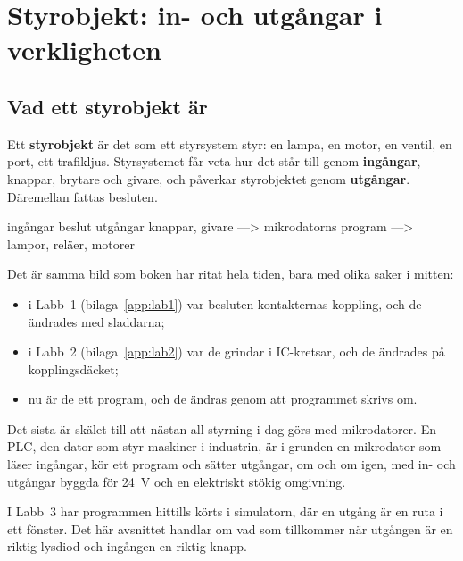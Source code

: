 %

\section{Styrobjekt: in- och utgångar i verkligheten}
\label{c11:app:a}

\subsection{Vad ett styrobjekt är}
\label{c11:a1}
Ett \textbf{styrobjekt} är det som ett styrsystem styr: en lampa, en motor, en ventil, en port, ett
trafikljus. Styrsystemet får veta hur det står till genom \textbf{ingångar}, knappar, brytare och
givare, och påverkar styrobjektet genom \textbf{utgångar}. Däremellan fattas besluten.

\begin{textdrawing}
   ingångar                    beslut                     utgångar
 knappar, givare   --->   mikrodatorns program   --->   lampor, reläer, motorer
\end{textdrawing}

\noindent Det är samma bild som boken har ritat hela tiden, bara med olika saker i mitten:
\begin{itemize}
  \item i Labb~1 (bilaga~\ref{app:lab1}) var besluten kontakternas koppling, och de ändrades med
    sladdarna;
  \item i Labb~2 (bilaga~\ref{app:lab2}) var de grindar i IC-kretsar, och de ändrades på
    kopplingsdäcket;
  \item nu är de ett program, och de ändras genom att programmet skrivs om.
\end{itemize}

Det sista är skälet till att nästan all styrning i dag görs med mikrodatorer. En PLC, den dator som
styr maskiner i industrin, är i grunden en mikrodator som läser ingångar, kör ett program och
sätter utgångar, om och om igen, med in- och utgångar byggda för 24~V och en elektriskt stökig
omgivning.

I Labb~3 har programmen hittills körts i simulatorn, där en utgång är en ruta i ett fönster. Det
här avsnittet handlar om vad som tillkommer när utgången är en riktig lysdiod och ingången en
riktig knapp.


